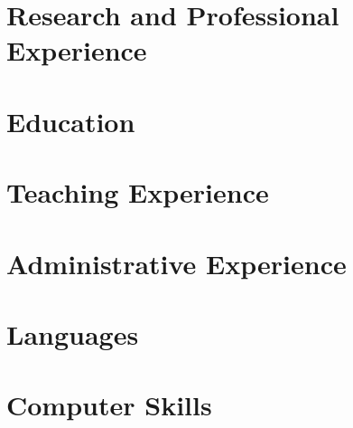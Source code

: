 \documentclass[10pt,a4paper,sans]{moderncv}
\begin{document}
\makecvtitle

\section*{}


\section{Research and Professional Experience}



\section{Education}


\pagebreak
\section{Teaching Experience}


\section{Administrative Experience}






\section{Languages}


\section{Computer Skills}


\clearpage
\end{document}
